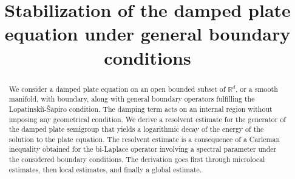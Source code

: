 \documentclass[JEP,XML,SOM,Unicode,published]{cedram}
\theoremstyle{plain}
\theoremstyle{definition}
\begin{document}
\title{Stabilization of the damped plate equation under general
boundary conditions}

\author[\initial{J.} \lastname{Le Rousseau}]{ }
\address{Laboratoire Analyse, Géométrie et Applications, 
Université Sorbonne Paris Nord, CNRS, Université Paris~8\\
Villetaneuse, France}

\author[\initial{E.} \lastname{Zongo}]{  }
\address{Dipartimento di Matematica, Università degli Studi di Milano\\
Via C. Saldini, 50, 20133 Milan, Italy\\
\&
Laboratoire Analyse, Géométrie et Applications, 
Université Sorbonne Paris Nord, CNRS, Université Paris~8\\
Villetaneuse, France\\
Current address: Laboratoire de
Mathématiques d'Orsay, Université Paris-Saclay, CNRS\\
91405  Orsay Cedex, France}

\begin{abstract}
We consider a damped plate equation on an open bounded subset of $\mathbb{R}^d$, or a smooth manifold, with boundary, along with general boundary operators fulfilling the Lopatinski\u{\i}-\v{S}apiro condition. The damping term acts on an internal region without imposing any geometrical condition. We derive a resolvent estimate for the generator of the damped plate semigroup that yields a logarithmic decay of the energy of the solution to the plate equation. The resolvent estimate is a consequence of a Carleman inequality obtained for the bi-Laplace operator involving a spectral parameter under the considered boundary conditions. The derivation goes first through microlocal estimates, then local estimates, and finally a global estimate.
\end{abstract}




\end{document}
